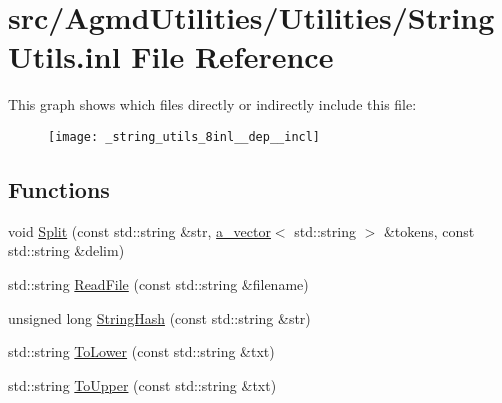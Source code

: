 \hypertarget{_string_utils_8inl}{\section{src/\+Agmd\+Utilities/\+Utilities/\+String\+Utils.inl File Reference}
\label{_string_utils_8inl}
}
This graph shows which files directly or indirectly include this file\+:\nopagebreak
\begin{figure}[H]
\begin{center}
\leavevmode
\texttt{[image: \_string\_utils\_8inl\_\_dep\_\_incl]}
\end{center}
\end{figure}
\subsection*{Functions}
\begin{DoxyCompactItemize}
\item 
void \hyperlink{_string_utils_8inl_af27301de54d6c5f94150be98960fb19b}{Split} (const std\+::string \&str, \hyperlink{_vector_8h_a3df82cea60ff4ad0acb44e58454406a5}{a\+\_\+vector}$<$ std\+::string $>$ \&tokens, const std\+::string \&delim)
\item 
std\+::string \hyperlink{_string_utils_8inl_a49e72d1f8eb4859f7ec8c45b15cce1c8}{Read\+File} (const std\+::string \&filename)
\item 
unsigned long \hyperlink{_string_utils_8inl_ab202cf4240041e664d48851f446680e4}{String\+Hash} (const std\+::string \&str)
\item 
std\+::string \hyperlink{_string_utils_8inl_a40652f9e667c7ecd6ce070e838105e0f}{To\+Lower} (const std\+::string \&txt)
\item 
std\+::string \hyperlink{_string_utils_8inl_ac2cf815ac75553477df390e8dba42032}{To\+Upper} (const std\+::string \&txt)
\end{DoxyCompactItemize}


